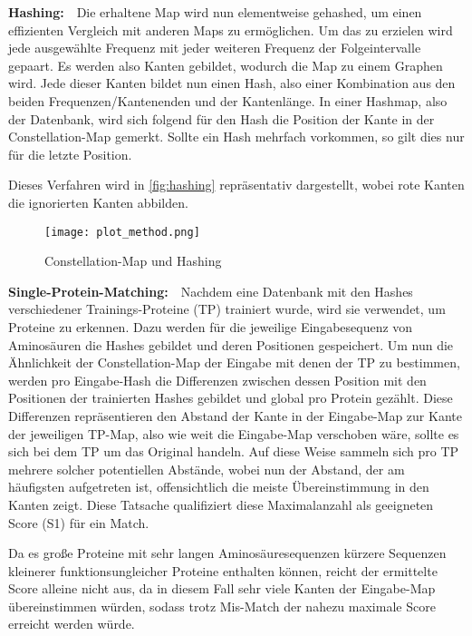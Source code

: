         \vspace{2.25mm}
        \textbf{Hashing:}\ \ Die erhaltene Map wird nun elementweise gehashed, um einen effizienten Vergleich mit anderen Maps zu ermöglichen. Um das zu erzielen wird jede ausgewählte Frequenz mit jeder weiteren Frequenz der Folgeintervalle gepaart. Es werden also Kanten gebildet, wodurch die Map zu einem Graphen wird. Jede dieser Kanten bildet nun einen Hash, also einer Kombination aus den beiden Frequenzen/Kantenenden und der Kantenlänge. In einer Hashmap, also der Datenbank, wird sich folgend für den Hash die Position der Kante in der Constellation-Map gemerkt. Sollte ein Hash mehrfach vorkommen, so gilt dies nur für die letzte Position.

        Dieses Verfahren wird in \autoref{fig:hashing} repräsentativ dargestellt, wobei rote Kanten die ignorierten Kanten abbilden.
        \begin{figure}[h]
            \texttt{[image: plot\_method.png]}
            \caption{Constellation-Map und Hashing}
            \label{fig:hashing}
        \end{figure}

        \vspace{2.25mm}
        \textbf{Single-Protein-Matching:}\ \ Nachdem eine Datenbank mit den Hashes verschiedener Trainings-Proteine (TP) trainiert wurde, wird sie verwendet, um Proteine zu erkennen. Dazu werden für die jeweilige Eingabesequenz von Aminosäuren die Hashes gebildet und deren Positionen gespeichert. Um nun die Ähnlichkeit der Constellation-Map der Eingabe mit denen der TP zu bestimmen, werden pro Eingabe-Hash die Differenzen zwischen dessen Position mit den Positionen der trainierten Hashes gebildet und global pro Protein gezählt. Diese Differenzen repräsentieren den Abstand der Kante in der Eingabe-Map zur Kante der jeweiligen TP-Map, also wie weit die Eingabe-Map verschoben wäre, sollte es sich bei dem TP um das Original handeln. Auf diese Weise sammeln sich pro TP mehrere solcher potentiellen Abstände, wobei nun der Abstand, der am häufigsten aufgetreten ist, offensichtlich die meiste Übereinstimmung in den Kanten zeigt. Diese Tatsache qualifiziert diese Maximalanzahl als geeigneten Score (S1) für ein Match.

        Da es große Proteine mit sehr langen Aminosäuresequenzen kürzere Sequenzen kleinerer funktionsungleicher Proteine enthalten können, reicht der ermittelte Score alleine nicht aus, da in diesem Fall sehr viele Kanten der Eingabe-Map übereinstimmen würden, sodass trotz Mis-Match der nahezu maximale Score erreicht werden würde.

